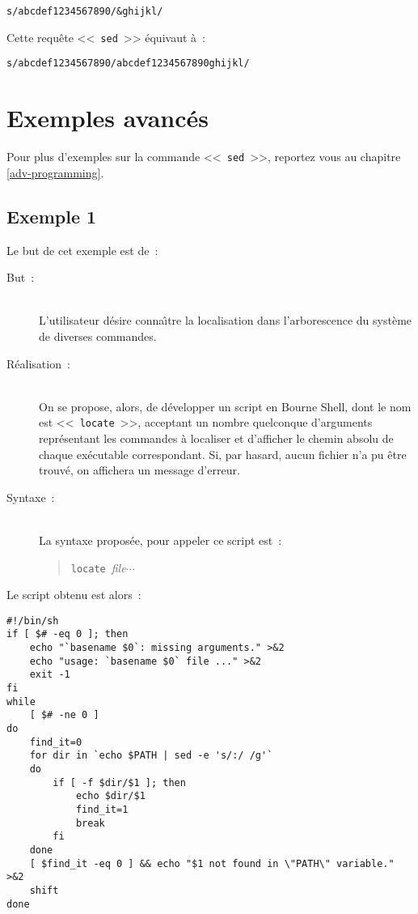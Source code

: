 \begin{example}
\begin{verbatim}
s/abcdef1234567890/&ghijkl/
\end{verbatim}

Cette requ{\^e}te <<~{\tt sed}~>> {\'e}quivaut {\`a}~:
\begin{verbatim}
s/abcdef1234567890/abcdef1234567890ghijkl/
\end{verbatim}
\end{example}

\section{Exemples avanc{\'e}s}

Pour plus d'exemples sur la commande <<~{\tt sed}~>>, reportez vous au
chapitre \ref{adv-programming}.


\subsection{\label{adv-fltrs-sed-ex1}Exemple 1}

Le but de cet exemple est de~:
\begin{description}
	\item[But~:]\mbox{}\\
		L'utilisateur d{\'e}sire conna{\^\i}tre la localisation dans l'arborescence du
		syst{\`e}me de diverses commandes.\\[2ex]
	\item[R{\'e}alisation~:]\mbox{}\\
		On se propose, alors, de d{\'e}velopper un script en Bourne Shell, dont le nom est
		<<~{\tt locate}~>>, acceptant un nombre quelconque d'arguments
		repr{\'e}sentant les commandes {\`a} localiser et d'afficher le chemin absolu de
		chaque ex{\'e}cutable correspondant. Si, par hasard, aucun fichier n'a pu {\^e}tre
		trouv{\'e}, on affichera un message d'erreur.\\[2ex]
	\item[Syntaxe~:]\mbox{}\\
		La syntaxe propos{\'e}e, pour appeler ce script est~:
		\begin{quote}
		{\tt locate}~{\sl file}$\cdots$
		\end{quote}
\end{description}

Le script obtenu est alors~:
\begin{verbatim}
#!/bin/sh
if [ $# -eq 0 ]; then
    echo "`basename $0`: missing arguments." >&2
    echo "usage: `basename $0` file ..." >&2
    exit -1
fi
while
    [ $# -ne 0 ]
do
    find_it=0
    for dir in `echo $PATH | sed -e 's/:/ /g'`
    do
        if [ -f $dir/$1 ]; then
            echo $dir/$1
            find_it=1
            break
        fi
    done
    [ $find_it -eq 0 ] && echo "$1 not found in \"PATH\" variable." >&2
    shift
done
\end{verbatim}

